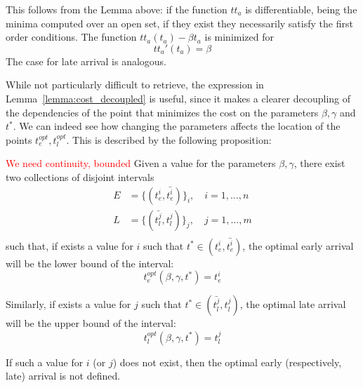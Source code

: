 This follows from the Lemma above:
if the function \(tt_a\) is differentiable, being the minima computed over an open set,
if they exist they necessarily satisfy the first order conditions.
The function \(tt_a(t_a) - \beta t_a\) is minimized for
\begin{equation*}
  tt_a'(t_a) = \beta
\end{equation*}
The case for late arrival is analogous.

While not particularly difficult to retrieve,
the expression in Lemma~\ref{lemma:cost_decoupled} is useful,
since it makes a clearer decoupling of the dependencies of the point that minimizes the cost on the parameters \(\beta, \gamma\) and \(t^*\).
We can indeed see how changing the parameters affects the location of the points \(t_e^{opt}, t_l^{opt}\).
This is described by the following proposition:
\begin{prop}
  \label{prop:into-early-late}
  \textcolor{red}{We need continuity, bounded}
  Given a value for the parameters \(\beta, \gamma\),
  there exist two collections of disjoint intervals
  \begin{align*}
    E & = \{(t_e^i, \bar{t_e^i})\}_i,\quad i = 1, \dots, n \\
    L & = \{(\bar{t_l^j}, t_l^j)\}_j,\quad j = 1, \dots, m \\
  \end{align*}
  such that, if exists a value for \(i\) such that \(t^* \in (t_e^i, \bar{t_e^i})\),
  the optimal early arrival will be the lower bound of the interval:
  \begin{equation*}
    t_e^{opt}(\beta, \gamma, t^*) = t_e^{i}
  \end{equation*}

  Similarly, if exists a value for \(j\) such that \(t^* \in (\bar{t_l^j}, t_l^j)\),
  the optimal late arrival will be the upper bound of the interval:
  \begin{equation*}
    t_l^{opt}(\beta, \gamma, t^*) = t_l^{j}
  \end{equation*}

  If such a value for \(i\) (or \(j\)) does not exist,
  then the optimal early (respectively, late) arrival is not defined.
\end{prop}

